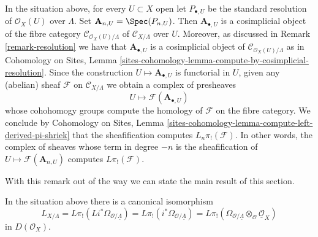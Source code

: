 \begin{remark}
\label{remark-compute-L-pi-shriek}
In the situation above, for every $U \subset X$ open let
$P_{\bullet, U}$ be the standard resolution of $\mathcal{O}_X(U)$
over $\Lambda$. Set $\mathbf{A}_{n, U} = \Spec(P_{n, U})$. Then
$\mathbf{A}_{\bullet, U}$
is a cosimplicial object of the fibre category
$\mathcal{C}_{\mathcal{O}_X(U)/\Lambda}$ of
$\mathcal{C}_{X/\Lambda}$ over $U$. Moreover, as discussed
in Remark \ref{remark-resolution} we have that $\mathbf{A}_{\bullet, U}$
is a cosimplicial object of $\mathcal{C}_{\mathcal{O}_X(U)/\Lambda}$
as in Cohomology on Sites, Lemma
\ref{sites-cohomology-lemma-compute-by-cosimplicial-resolution}.
Since the construction $U \mapsto \mathbf{A}_{\bullet, U}$ is functorial
in $U$, given any (abelian) sheaf $\mathcal{F}$ on $\mathcal{C}_{X/\Lambda}$
we obtain a complex of presheaves
$$
U \longmapsto \mathcal{F}(\mathbf{A}_{\bullet, U})
$$
whose cohohomogy groups compute the homology of $\mathcal{F}$ on the fibre
category. We conclude by
Cohomology on Sites, Lemma
\ref{sites-cohomology-lemma-compute-left-derived-pi-shriek}
that the sheafification computes $L_n\pi_!(\mathcal{F})$.
In other words, the complex of sheaves whose term in degree $-n$ is
the sheafification of $U \mapsto \mathcal{F}(\mathbf{A}_{n, U})$ computes
$L\pi_!(\mathcal{F})$.
\end{remark}

\noindent
With this remark out of the way we can state the main
result of this section.

\begin{lemma}
\label{lemma-cotangent-morphism-schemes}
In the situation above there is a canonical isomorphism
$$
L_{X/\Lambda} = 
L\pi_!(Li^*\Omega_{\mathcal{O}/\underline{\Lambda}}) =
L\pi_!(i^*\Omega_{\mathcal{O}/\underline{\Lambda}}) =
L\pi_!(\Omega_{\mathcal{O}/\underline{\Lambda}}
\otimes_\mathcal{O} \underline{\mathcal{O}}_X)
$$
in $D(\mathcal{O}_X)$.
\end{lemma}

